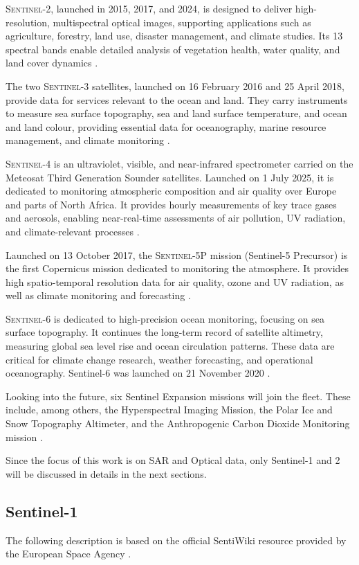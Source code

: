 \textsc{Sentinel-2}, launched in 2015, 2017, and 2024, is designed to deliver high-resolution, multispectral optical images, supporting applications such as agriculture, forestry, land use, disaster management, and climate studies. Its 13 spectral bands enable detailed analysis of vegetation health, water quality, and land cover dynamics \cite{ESA_Copernicus}.

The two \textsc{Sentinel-3} satellites, launched on 16 February 2016 and 25 April 2018, provide data for services relevant to the ocean and land. They carry instruments to measure sea surface topography, sea and land surface temperature, and ocean and land colour, providing essential data for oceanography, marine resource management, and climate monitoring \cite{ESA_SentinelMissions,ESA_Copernicus}.

\textsc{Sentinel-4} is an ultraviolet, visible, and near-infrared spectrometer carried on the Meteosat Third Generation Sounder satellites. Launched on 1 July 2025, it is dedicated to monitoring atmospheric composition and air quality over Europe and parts of North Africa. It provides hourly measurements of key trace gases and aerosols, enabling near-real-time assessments of air pollution, UV radiation, and climate-relevant processes \cite{ESA_Copernicus}.

Launched on 13 October 2017, the \textsc{Sentinel-5P} mission (Sentinel-5 Precursor) is the first Copernicus mission dedicated to monitoring the atmosphere. It provides high spatio-temporal resolution data for air quality, ozone and UV radiation, as well as climate monitoring and forecasting \cite{ESA_SentinelMissions}.

\textsc{Sentinel-6} is dedicated to high-precision ocean monitoring, focusing on sea surface topography. It continues the long-term record of satellite altimetry, measuring global sea level rise and ocean circulation patterns. These data are critical for climate change research, weather forecasting, and operational oceanography. Sentinel-6 was launched on 21 November 2020 \cite{ESA_SentinelMissions}. 

Looking into the future, six Sentinel Expansion missions will join the fleet. These include, among others, the Hyperspectral Imaging Mission, the Polar Ice and Snow Topography Altimeter, and the Anthropogenic Carbon Dioxide Monitoring mission \cite{ESA_Copernicus}.

Since the focus of this work is on SAR and Optical data, only Sentinel-1 and 2 will be discussed in details in the next sections. 
\subsection{Sentinel-1}
The following description is based on the official SentiWiki resource provided by the European Space Agency \cite{sentiwiki}. 

